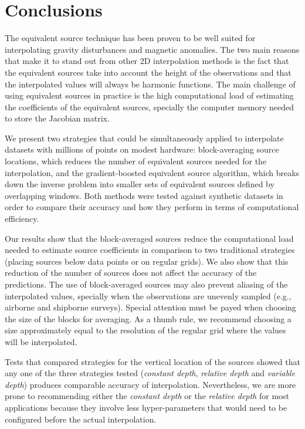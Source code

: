 
\section{Conclusions}

The equivalent source technique has been proven to be well suited for
interpolating gravity disturbances and magnetic anomalies.
The two main reasons that make it to stand out from other 2D interpolation
methods is the fact that the equivalent sources take into account the height of
the observations and that the interpolated values will always be harmonic
functions.
The main challenge of using equivalent sources in practice is the high
computational load of estimating the coefficients of the equivalent sources,
specially the computer memory needed to store the Jacobian matrix.

We present two strategies that could be simultaneously applied to interpolate
datasets with millions of points on modest hardware:
block-averaging source locations, which reduces the number of equivalent
sources needed for the interpolation,
and the gradient-boosted equivalent source algorithm, which breaks down the
inverse problem into smaller sets of equivalent sources defined by overlapping
windows.
Both methods were tested against synthetic datasets in order to compare their
accuracy and how they perform in terms of computational efficiency.

Our results show that the block-averaged sources reduce the computational
load needed to estimate source coefficients in comparison to two traditional
strategies (placing sources below data points or on regular grids).
We also show that this reduction of the number of sources does not affect
the accuracy of the predictions.
The use of block-averaged sources may also prevent aliasing of the interpolated
values, specially when the observations are unevenly sampled (e.g., airborne
and shipborne surveys).
Special attention must be payed when choosing the size of the blocks for
averaging.
As a thumb rule, we recommend choosing a size approximately equal to
the resolution of the regular grid where the values will be interpolated.

Tests that compared strategies for the vertical location of the
sources showed that any one of the three strategies tested
(\emph{constant depth}, \emph{relative depth} and \emph{variable depth})
produces comparable accuracy of interpolation.
Nevertheless, we are more prone to recommending either the \emph{constant
depth} or the \emph{relative depth} for most applications because they involve
less hyper-parameters that would need to be configured before the actual
interpolation.

